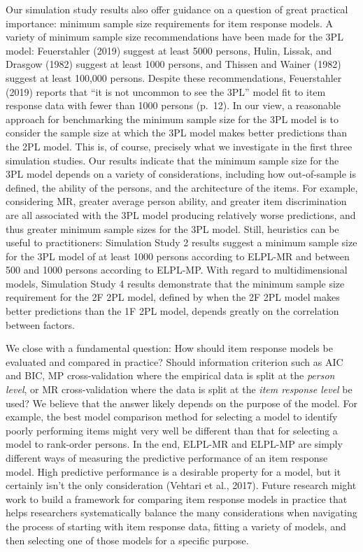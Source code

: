 \documentclass[
  english,
  man,floatsintext]{apa7}
\begin{document}
Our simulation study results also offer guidance on a question of great practical importance: minimum sample size requirements for item response models. A variety of minimum sample size recommendations have been made for the 3PL model: Feuerstahler (2019) suggest at least 5000 persons, Hulin, Lissak, and Drasgow (1982) suggest at least 1000 persons, and Thissen and Wainer (1982) suggest at least 100,000 persons. Despite these recommendations, Feuerstahler (2019) reports that ``it is not uncommon to see the 3PL'' model fit to item response data with fewer than 1000 persons (p.~12). In our view, a reasonable approach for benchmarking the minimum sample size for the 3PL model is to consider the sample size at which the 3PL model makes better predictions than the 2PL model. This is, of course, precisely what we investigate in the first three simulation studies. Our results indicate that the minimum sample size for the 3PL model depends on a variety of considerations, including how out-of-sample is defined, the ability of the persons, and the architecture of the items. For example, considering MR, greater average person ability, and greater item discrimination are all associated with the 3PL model producing relatively worse predictions, and thus greater minimum sample sizes for the 3PL model. Still, heuristics can be useful to practitioners: Simulation Study 2 results suggest a minimum sample size for the 3PL model of at least 1000 persons according to ELPL-MR and between 500 and 1000 persons according to ELPL-MP. With regard to multidimensional models, Simulation Study 4 results demonstrate that the minimum sample size requirement for the 2F 2PL model, defined by when the 2F 2PL model makes better predictions than the 1F 2PL model, depends greatly on the correlation between factors.

We close with a fundamental question: How should item response models be evaluated and compared in practice? Should information criterion such as AIC and BIC, MP cross-validation where the empirical data is split at the \emph{person level}, or MR cross-validation where the data is split at the \emph{item response level} be used? We believe that the answer likely depends on the purpose of the model. For example, the best model comparison method for selecting a model to identify poorly performing items might very well be different than that for selecting a model to rank-order persons. In the end, ELPL-MR and ELPL-MP are simply different ways of measuring the predictive performance of an item response model. High predictive performance is a desirable property for a model, but it certainly isn't the only consideration (Vehtari et al., 2017). Future research might work to build a framework for comparing item response models in practice that helps researchers systematically balance the many considerations when navigating the process of starting with item response data, fitting a variety of models, and then selecting one of those models for a specific purpose.
\end{document}
